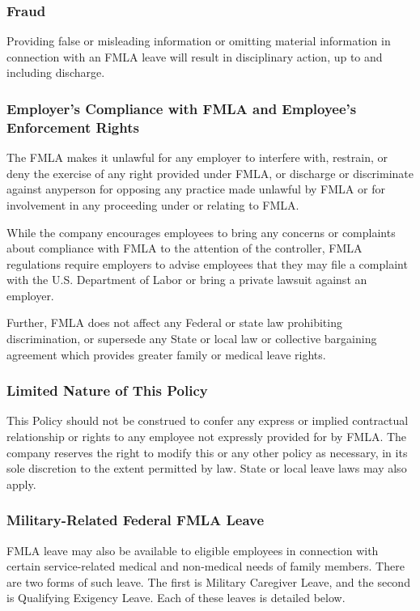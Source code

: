 \subsubsection{Fraud}

Providing false or misleading information or omitting material information in connection with an FMLA leave will result in disciplinary action, up to and including discharge.

\subsubsection{Employer's Compliance with FMLA and Employee's Enforcement Rights}

The FMLA makes it unlawful for any employer to interfere with, restrain, or deny the exercise of any right provided under FMLA, or discharge or discriminate against anyperson for opposing any practice made unlawful by FMLA or for involvement in any proceeding under or relating to FMLA.

While the company encourages employees to bring any concerns or complaints about compliance with FMLA to the attention of the controller, FMLA regulations require employers to advise employees that they may file a complaint with the U.S. Department of Labor or bring a private lawsuit against an employer.

Further, FMLA does not affect any Federal or state law prohibiting discrimination, or supersede any State or local law or collective bargaining agreement which provides greater family or medical leave rights.

\subsubsection{Limited Nature of This Policy}

This Policy should not be construed to confer any express or implied contractual relationship or rights to any employee not expressly provided for by FMLA. The company reserves the right to modify this or any other policy as necessary, in its sole discretion to the extent permitted by law. State or local leave laws may also apply.

\subsubsection{Military-Related Federal FMLA Leave}

FMLA leave may also be available to eligible employees in connection with certain service-related medical and non-medical needs of family members. There are two forms of such leave. The first is Military Caregiver Leave, and the second is Qualifying Exigency Leave. Each of these leaves is detailed below.

